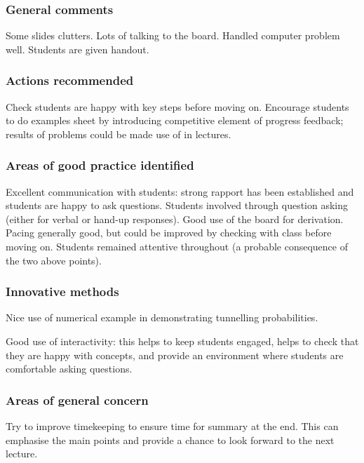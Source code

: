 \subsubsection{General comments}

Some slides clutters. Lots of talking to the board. Handled computer problem well. Students are given handout.

\subsubsection{Actions recommended}

Check students are happy with key steps before moving on. Encourage students to do examples sheet by introducing competitive element of progress feedback; results of problems could be made use of in lectures.

\subsubsection{Areas of good practice identified}

Excellent communication with students: strong rapport has been established and students are happy to ask questions. Students involved through question asking (either for verbal or hand-up responses). Good use of the board for derivation. Pacing generally good, but could be improved by checking with class before moving on. Students remained attentive throughout (a probable consequence of the two above points).

\subsubsection{Innovative methods}

Nice use of numerical example in demonstrating tunnelling probabilities.

Good use of interactivity: this helps to keep students engaged, helps to check that they are happy with concepts, and provide an environment where students are comfortable asking questions.

\subsubsection{Areas of general concern}

Try to improve timekeeping to ensure time for summary at the end. This can emphasise the main points and provide a chance to look forward to the next lecture.

